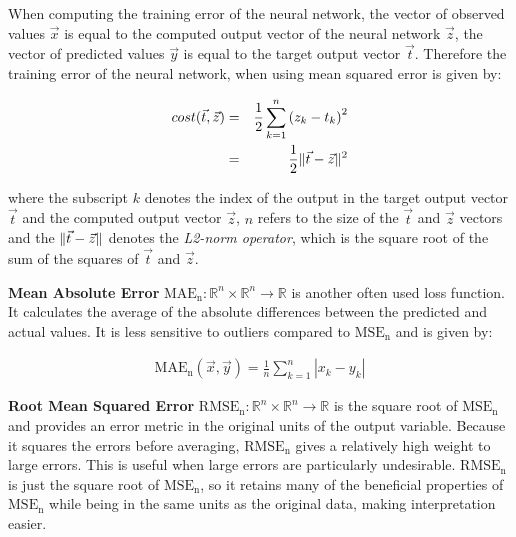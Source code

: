 When computing the training error of the neural network, the vector of observed values $\vec{x}$ is equal to the computed output vector of the neural network $\vec{z}$, the vector of predicted values $\vec{y}$ is equal to the target output vector $\vec{t}$. Therefore the training error of the neural network, when using mean squared error is given by:




\begin{eqnarray*}
    cost(\vec{t}, \vec{z}) & = & \frac{1}{2} \sum_{k=1}^{n}\left(z_{k} - t_k\right)^{2} \\
    & = & \frac{1}{2}\|{\vec{t}-\vec{z}}\|^{2} 
\end{eqnarray*}

where the subscript $k$ denotes the index of the output in the target output vector $\vec{t}$ and the computed output vector $\vec{z}$, $n$ refers to the size of the $\vec{t}$ and $\vec{z}$ vectors and the $\|{\vec{t}-\vec{z}}\|$ denotes the \textit{L2-norm operator}, which is the square root of the sum of the squares of $\vec{t}$ and $\vec{z}$.

\textbf{Mean Absolute Error} $\mathrm{MAE_n}: \mathbb{R}^n \times \mathbb{R}^n \to \mathbb{R}$ is another often used loss function. It calculates the average of the absolute differences between the predicted and actual values. It is less sensitive to outliers compared to $\mathrm{MSE_n}$ and is given by:

\begin{eqnarray*}
\mathrm{MAE_n}(\vec{x}, \vec{y})= \frac{1}{n} \sum_{k=1}^{n} |x_k - y_k|
\end{eqnarray*}

\textbf{Root Mean Squared Error} $\mathrm{RMSE_n}: \mathbb{R}^n \times \mathbb{R}^n \to \mathbb{R}$ is the square root of $\mathrm{MSE_n}$ and provides an error metric in the original units of the output variable. Because it squares the errors before averaging, $\mathrm{RMSE_n}$ gives a relatively high weight to large errors. This is useful when large errors are particularly undesirable. $\mathrm{RMSE_n}$ is just the square root of $\mathrm{MSE_n}$, so it retains many of the beneficial properties of $\mathrm{MSE_n}$ while being in the same units as the original data, making interpretation easier.

